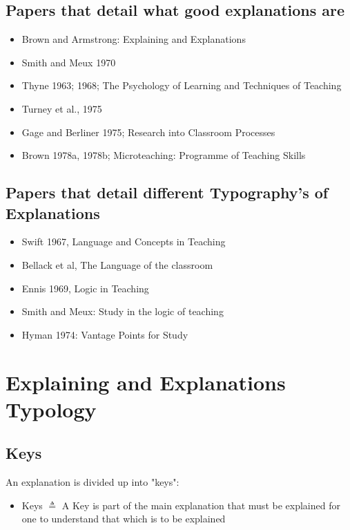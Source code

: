 \documentclass[10pt, letterpaper]{article}
\begin{document}
\subsection*{Papers that detail what good explanations are}
\label{sec:org6a7b010}
\begin{itemize}
\item Brown and Armstrong: Explaining and Explanations \cite{brown1984explaining}
\item Smith and Meux 1970
\item Thyne 1963; 1968; The Psychology of Learning and Techniques of Teaching \cite{thyne1965psychology}
\item Turney et al., 1975
\item Gage and Berliner 1975; Research into Classroom Processes
\item Brown 1978a, 1978b; Microteaching: Programme of Teaching Skills \cite{10.2307/3120386}
\end{itemize}

\subsection*{Papers that detail different Typography's of Explanations}
\label{sec:orgdd5253c}
\begin{itemize}
\item Swift 1967, Language and Concepts in Teaching \cite{smith1967language}
\item Bellack et al, The Language of the classroom \cite{bellack1966language}
\item Ennis 1969, Logic in Teaching \cite{ennis1969logic}
\item Smith and Meux: Study in the logic of teaching \cite{Smith1970-SMIASO-13}
\item Hyman 1974: Vantage Points for Study \cite{hyman1968teaching}
\end{itemize}


\section*{Explaining and Explanations Typology}
\label{sec:org6d4a6c2}

\subsection*{Keys}
\label{sec:orgb38110a}
An explanation is divided up into "keys":
\begin{itemize}
\item Keys \(\triangleq\) A Key is part of the main explanation that must be explained for one to understand that which is to be explained
\end{itemize}
\end{document}
